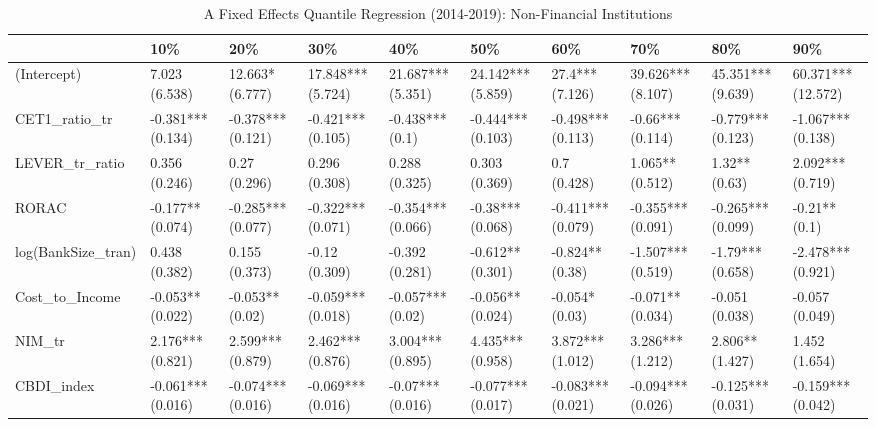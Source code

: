 \begin{table}[ht]
\centering
\caption{A Fixed Effects Quantile Regression (2014-2019): Non-Financial Institutions} 
\begingroup\small
\begin{tabular}{llllllllll}
  \toprule
 & 10\% & 20\% & 30\% & 40\% & 50\% & 60\% & 70\% & 80\% & 90\% \\ 
  \midrule
(Intercept) & 7.023 (6.538) & 12.663* (6.777) & 17.848*** (5.724) & 21.687*** (5.351) & 24.142*** (5.859) & 27.4*** (7.126) & 39.626*** (8.107) & 45.351*** (9.639) & 60.371*** (12.572) \\ 
  CET1\_ratio\_tr & -0.381*** (0.134) & -0.378*** (0.121) & -0.421*** (0.105) & -0.438*** (0.1) & -0.444*** (0.103) & -0.498*** (0.113) & -0.66*** (0.114) & -0.779*** (0.123) & -1.067*** (0.138) \\ 
  LEVER\_tr\_ratio & 0.356 (0.246) & 0.27 (0.296) & 0.296 (0.308) & 0.288 (0.325) & 0.303 (0.369) & 0.7 (0.428) & 1.065** (0.512) & 1.32** (0.63) & 2.092*** (0.719) \\ 
  RORAC & -0.177** (0.074) & -0.285*** (0.077) & -0.322*** (0.071) & -0.354*** (0.066) & -0.38*** (0.068) & -0.411*** (0.079) & -0.355*** (0.091) & -0.265*** (0.099) & -0.21** (0.1) \\ 
  log(BankSize\_tran) & 0.438 (0.382) & 0.155 (0.373) & -0.12 (0.309) & -0.392 (0.281) & -0.612** (0.301) & -0.824** (0.38) & -1.507*** (0.519) & -1.79*** (0.658) & -2.478*** (0.921) \\ 
  Cost\_to\_Income & -0.053** (0.022) & -0.053** (0.02) & -0.059*** (0.018) & -0.057*** (0.02) & -0.056** (0.024) & -0.054* (0.03) & -0.071** (0.034) & -0.051 (0.038) & -0.057 (0.049) \\ 
  NIM\_tr & 2.176*** (0.821) & 2.599*** (0.879) & 2.462*** (0.876) & 3.004*** (0.895) & 4.435*** (0.958) & 3.872*** (1.012) & 3.286*** (1.212) & 2.806** (1.427) & 1.452 (1.654) \\ 
  CBDI\_index & -0.061*** (0.016) & -0.074*** (0.016) & -0.069*** (0.016) & -0.07*** (0.016) & -0.077*** (0.017) & -0.083*** (0.021) & -0.094*** (0.026) & -0.125*** (0.031) & -0.159*** (0.042) \\ 
   \bottomrule
\end{tabular}
\endgroup
\end{table}
